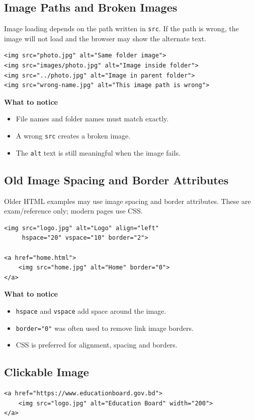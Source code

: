 \subsection{Image Paths and Broken Images}
Image loading depends on the path written in \texttt{src}. If the path is wrong, the image will not load and the browser may show the alternate text.

\begin{lstlisting}[style=htmlide, caption={Image Path Variations}]
<img src="photo.jpg" alt="Same folder image">
<img src="images/photo.jpg" alt="Image inside folder">
<img src="../photo.jpg" alt="Image in parent folder">
<img src="wrong-name.jpg" alt="This image path is wrong">
\end{lstlisting}

\textbf{What to notice}
\begin{itemize}
    \item File names and folder names must match exactly.
    \item A wrong \texttt{src} creates a broken image.
    \item The \texttt{alt} text is still meaningful when the image fails.
\end{itemize}

\subsection{Old Image Spacing and Border Attributes}
Older HTML examples may use image spacing and border attributes. These are exam/reference only; modern pages use CSS.

\begin{lstlisting}[style=htmlide, caption={Old Image Attributes}]
<img src="logo.jpg" alt="Logo" align="left"
     hspace="20" vspace="10" border="2">

<a href="home.html">
    <img src="home.jpg" alt="Home" border="0">
</a>
\end{lstlisting}

\textbf{What to notice}
\begin{itemize}
    \item \texttt{hspace} and \texttt{vspace} add space around the image.
    \item \texttt{border="0"} was often used to remove link image borders.
    \item CSS is preferred for alignment, spacing and borders.
\end{itemize}

\subsection{Clickable Image}
\begin{lstlisting}[style=htmlide, caption={Image Link}]
<a href="https://www.educationboard.gov.bd">
    <img src="logo.jpg" alt="Education Board" width="200">
</a>
\end{lstlisting}

